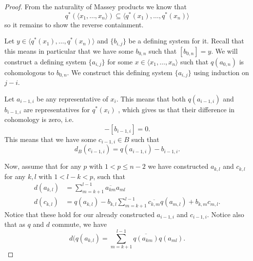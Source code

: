 \begin{proof}
From the naturality of Massey products we know that 
\begin{equation*}
    q^*(\langle x_1, \ldots, x_n\rangle) \subseteq \langle q^*(x_1),\ldots, q^*(x_n)\rangle
\end{equation*}
so it remains to show the reverse containment. 

Let $y\in \langle q^*(x_1), \ldots, q^*(x_n)\rangle$ and $\{b_{i,j}\}$ be a defining system for it. Recall that this means in particular that we have some $b_{0,n}$ such that $[b_{0,n}] = y$. We will construct a defining system $\{a_{i,j}\}$ for some $x\in \langle x_1, \ldots, x_n\rangle $ such that $ q(a_{0,n})$ is cohomologous to $b_{0,n}$. We construct this defining system $\{a_{i,j}\}$ using induction on $j-i$. 

Let $a_{i-1, i}$ be any representative of $x_i$. This means that both $q(a_{i-1, i})$ and $b_{i-1, i}$ are representatives for $q^*(x_i)$ , which gives us that their difference in cohomology is zero, i.e. 
\begin{equation*}
    [q(a_{i-1, i})]-[b_{i-1, i}] = 0.
\end{equation*}
This means that we have some $c_{i-1, i} \in B$ such that
\begin{equation*}
    d_B(c_{i-1, i}) = q(a_{i-1, i}) - b_{i-1, i}.
\end{equation*}

Now, assume that for any $p$ with $1<p\leq n-2$ we have constructed $a_{k,l}$ and $c_{k,l}$ for any $k,l$ with $1< l-k<p$, such that 
\begin{align}
    d(a_{k,l}) &= \sum_{m=k+1}^{l-1}\overline{a_{km}}a_{ml} 
    \\
    d(c_{k,l}) &= q(a_{k,l}) - b_{k,l} \sum_{m=k+1}^{l-1}\overline{c_{k,m}}q(a_{m,l}) + b_{k,m}c_{m,l}.
\end{align}
Notice that these hold for our already constructed $a_{i-1, i}$ and $c_{i-1, i}$. Notice also that as $q$ and $d$ commute, we have 
\begin{equation*}
    d(q(a_{k,l}) = \sum_{m=k+1}^{l-1}\overline{q(a_{km})}q(a_{ml}) .
\end{equation*}


\end{proof}
